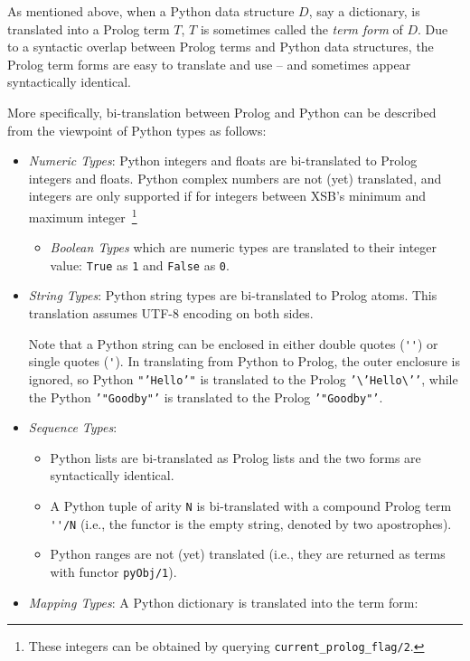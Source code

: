 As mentioned above, when a Python data structure $D$, say a
dictionary, is translated into a Prolog term $T$, $T$ is sometimes
called the {\em term form} of $D$.  Due to a syntactic overlap between
Prolog terms and Python data structures, the Prolog term forms are
easy to translate and use -- and sometimes appear syntactically
identical.

More specifically, bi-translation between Prolog and Python can be
described from the viewpoint of Python types as follows: 

\begin{itemize}
       \item {\em Numeric Types}: Python integers and floats are
         bi-translated to Prolog integers and floats.  Python complex
         numbers are not (yet) translated, and integers are only
         supported if for integers between XSB's minimum and maximum
         integer~\footnote{These integers can be obtained by querying
           {\tt current\_prolog\_flag/2}.}
         \begin{itemize}
           \item {\em Boolean Types} which are numeric types are
             translated to their integer value: {\tt True} as {\tt 1}
             and {\tt False} as {\tt 0}.
         \end{itemize}
       \item {\em String Types}: Python string types are bi-translated
         to Prolog atoms.  This translation assumes UTF-8 encoding on
         both sides.

         Note that a Python string can be enclosed in either double
         quotes (\verb|''|) or single quotes (\verb|'|).  In
         translating from Python to Prolog, the outer enclosure is
         ignored, so Python {\tt "'Hello'"} is translated to the
         Prolog {\tt '\textbackslash{}'Hello\textbackslash{}'{}'},
         while the Python {\tt '"Goodby"'} is translated to the Prolog
         {\tt '"Goodby"'}.
       \item {\em Sequence Types}:
         \begin{itemize}
           \item Python lists are bi-translated as Prolog lists and
             the two forms are syntactically identical.
           \item A Python tuple of arity {\tt N} is bi-translated with
             a compound Prolog term \verb|''/N| (i.e., the functor is
             the empty string, denoted by two apostrophes).
             \item Python ranges are not (yet) translated (i.e., they
               are returned as terms with functor {\tt pyObj/1}).
         \end{itemize}
       \item {\em Mapping Types}: A Python dictionary is translated
         into the term form:


\end{itemize}
